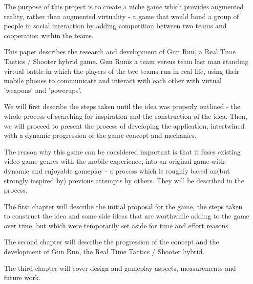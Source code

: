 The purpose of this project is to create a niche game which provides augmented
reality, rather than augmented virtuality - a game that would bond a group of
people in social interaction by adding competition between two teams and
cooperation within the teams.\newline

This paper describes the research and development of \"Gun Run\", a
Real Time Tactics / Shooter hybrid game. \"Gun Run\" is a team versus team last
man standing virtual battle in which the players of the two teams run in real
life, using their mobile phones to communicate and interact with each other with
virtual 'weapons' and 'powerups'.\newline

We will first describe the steps taken until the idea was properly outlined -
the whole process of searching for inspiration and the construction of the idea.
Then, we will proceed to present the process of developing the application,
intertwined with a dynamic progression of the game concept and
mechanics.\newline

The reason why this game can be considered important is that it fuses existing
video game genres with the mobile experience, into an original game with dynamic
and enjoyable gameplay - a process which is roughly based on(but strongly
inspired by) previous attempts by others. They will be described in the
process.\newline

The first chapter will describe the initial proposal for the game, the steps
taken to construct the idea and some side ideas that are worthwhile adding to
the game over time, but which were temporarily set aside for time and effort
reasons.\newline

The second chapter will describe the progression of the concept and the
development of \"Gun Run\", the Real Time Tactics / Shooter
hybrid.\newline

The third chapter will cover design and gameplay aspects, measurements and
future work.\newline